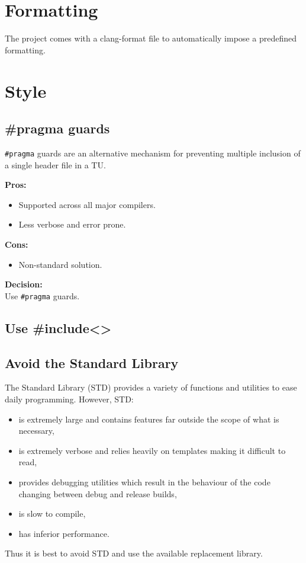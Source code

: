 \documentclass[12pt, a4paper]{article}
\newenvironment{itemlist}
{
\vspace{-0.5\topsep}
\begin{itemize}
  \setlength{\itemsep}{4pt}
  \setlength{\parskip}{0pt}
} {
\end{itemize}
\vspace{-0.5\topsep}
}
\newcommand{\code}[1]{\texttt{#1}}
\begin{document}
\section{Formatting}
The project comes with a clang-format file to automatically impose a predefined
formatting.

\section{Style}
\subsection{\#pragma guards}
\code{\#pragma} guards are an alternative mechanism for preventing multiple
inclusion of a single header file in a TU.

\noindent\textbf{Pros:}
\begin{itemlist}
  \item Supported across all major compilers.
  \item Less verbose and error prone.
\end{itemlist}

\noindent\textbf{Cons:}
\begin{itemlist}
  \item Non-standard solution.
\end{itemlist}

\noindent\textbf{Decision:} \\
Use \code{\#pragma} guards.

\subsection{Use \#include<>}

\subsection{Avoid the Standard Library}
The Standard Library (STD) provides a variety of functions and utilities to ease
daily programming. However, STD:
\begin{itemlist}
  \item is extremely large and contains features far outside the scope of what
  is necessary,
  \item is extremely verbose and relies heavily on templates making it difficult
  to read,
  \item provides debugging utilities which result in the behaviour of the code
  changing between debug and release builds,
  \item is slow to compile,
  \item has inferior performance.
\end{itemlist}
\noindent Thus it is best to avoid STD and use the available replacement
library.
\end{document}
